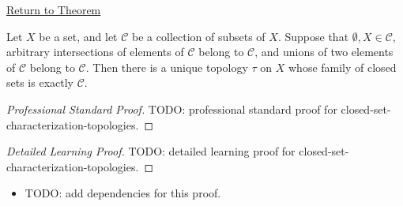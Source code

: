\newpage
{}
\label{prf:closed-set-characterization-topologies}

\begin{remark*}[Return]
\hyperref[thm:closed-set-characterization-topologies]{Return to Theorem}
\end{remark*}

\begin{theorem*}
Let \(X\) be a set, and let \(\mathcal{C}\) be a collection of subsets of
\(X\).  Suppose that \(\emptyset,X\in\mathcal{C}\), arbitrary intersections
of elements of \(\mathcal{C}\) belong to \(\mathcal{C}\), and unions of two
elements of \(\mathcal{C}\) belong to \(\mathcal{C}\).  Then there is a
unique topology \(\tau\) on \(X\) whose family of closed sets is exactly
\(\mathcal{C}\).
\end{theorem*}

\begin{proof}[Professional Standard Proof]
\LRAProofBodyStart
TODO: professional standard proof for closed-set-characterization-topologies.
\end{proof}

\begin{proof}[Detailed Learning Proof]
\LRAProofBodyStart
TODO: detailed learning proof for closed-set-characterization-topologies.
\end{proof}

\begin{remark*}
\end{remark*}

\begin{dependencies}
\begin{itemize}
  \item TODO: add dependencies for this proof.
\end{itemize}
\end{dependencies}

\clearpage
